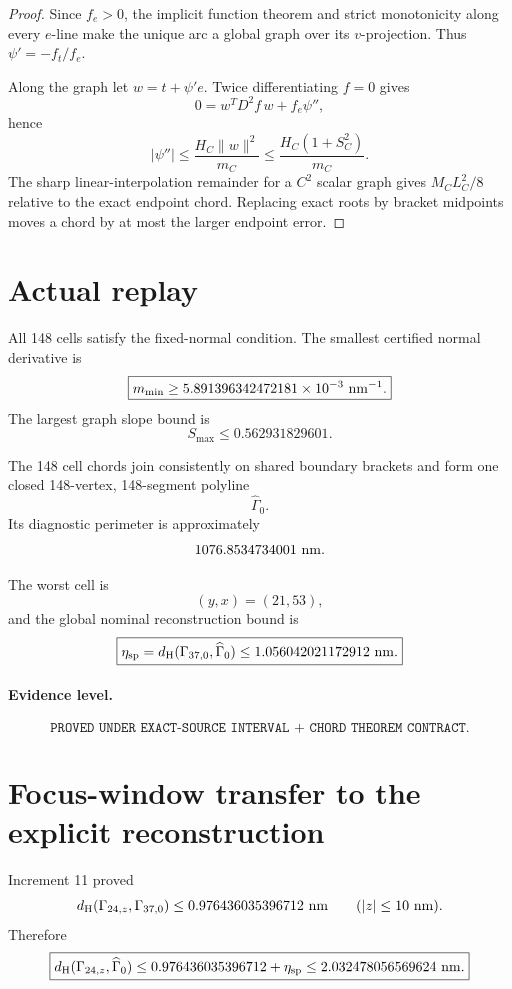 \documentclass[11pt]{article}
\newcommand{\dH}{d_{\mathrm H}}
\begin{document}
\begin{proof}
Since \(f_e>0\), the implicit function theorem and strict monotonicity along
every \(e\)-line make the unique arc a global graph over its \(v\)-projection.
Thus \(\psi'=-f_t/f_e\).

Along the graph let \(w=t+\psi'e\). Twice differentiating \(f=0\) gives
\[
0=w^TD^2f\,w+f_e\psi'',
\]
hence
\[
|\psi''|
\le
\frac{H_C\|w\|^2}{m_C}
\le
\frac{H_C(1+S_C^2)}{m_C}.
\]
The sharp linear-interpolation remainder for a \(C^2\) scalar graph gives
\(M_CL_C^2/8\) relative to the exact endpoint chord. Replacing exact roots
by bracket midpoints moves a chord by at most the larger endpoint error.
\end{proof}

\section{Actual replay}

All 148 cells satisfy the fixed-normal condition. The smallest certified
normal derivative is
\[
\boxed{
m_{\min}
\ge
5.891396342472181\times10^{-3}\ {\rm nm}^{-1}.
}
\]
The largest graph slope bound is
\[
\boxed{S_{\max}\le0.562931829601}.
\]

The 148 cell chords join consistently on shared boundary brackets and form
one closed 148-vertex, 148-segment polyline
\[
\widehat\Gamma_0.
\]
Its diagnostic perimeter is approximately
\[
1076.8534734001\ {\rm nm}.
\]

The worst cell is
\[
\boxed{(y,x)=(21,53)},
\]
and the global nominal reconstruction bound is
\[
\boxed{
\eta_{\rm sp}
=
\dH(\Gamma_{37,0},\widehat\Gamma_0)
\le
1.056042021172912\ {\rm nm}.
}
\]

\paragraph{Evidence level.}
\[
\boxed{
\texttt{PROVED UNDER EXACT-SOURCE INTERVAL + CHORD THEOREM CONTRACT}.
}
\]

\section{Focus-window transfer to the explicit reconstruction}

Increment 11 proved
\[
\dH(\Gamma_{24,z},\Gamma_{37,0})
\le
0.976436035396712\ {\rm nm}
\qquad(|z|\le10\ {\rm nm}).
\]
Therefore
\[
\boxed{
\dH(\Gamma_{24,z},\widehat\Gamma_0)
\le
0.976436035396712+\eta_{\rm sp}
\le
2.032478056569624\ {\rm nm}.
}
\]
\end{document}
